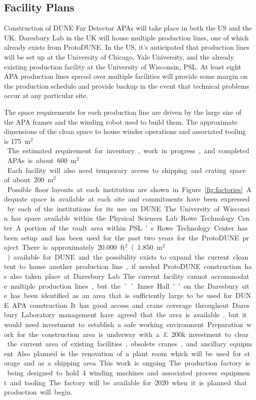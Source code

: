 \subsection{Facility Plans}
\label{sec:fdsp-apa-facility}

Construction of DUNE Far Detector APAs will take place in both the US and the UK. Daresbury Lab in the UK will house multiple production lines, one of which already exists from ProtoDUNE. In the US, it's anticipated that production lines will be set up at the University of Chicago, Yale University, and the already existing production facility at the University of Wisconsin, PSL. At least eight APA production lines spread over multiple facilities will provide some margin on the production schedule and provide backup in the event that technical problems occur at any particular site. 

The space requirements for each production line are driven by the large size of the APA frames and the winding robot used to build them. The approximate dimensions of the clean space to house winder operations and associated tooling is \SI{175}{m$^2$}. The estimated requirement for inventory, work in progress, and completed APAs is about \SI{600}{m$^2$}. Each facility will also need temporary access to shipping and crating space of about \SI{200}{m$^2$}. Possible floor layouts at each institution are shown in Figure~\ref{fig:factories}. Adequate space is available at each site and commitments have been expressed by each of the institutions for its use on DUNE. 

The University of Wisconsin has space available within the Physical Sciences Lab Rowe Technology Center. A portion of the vault area within PSL's Rowe Technology Center has been setup and has been used for the past two years for the ProtoDUNE project. There is approximately \SI{20,000}{ft$^2$} (\SI{1,850}{m$^2$}) available for DUNE and the possibility exists to expand the current clean tent to house another production line, if needed. 

ProtoDUNE construction has also taken place at Daresbury Lab.  The current facility cannot accommodate multiple production lines, but the ``Inner Hall'' on the Daresbury site has been identified as an area that is sufficiently large to be used for DUNE APA construction. It has good access and crane coverage throughout. Daresbury Laboratory management have agreed that the area is available, but it would need investment to establish a safe working environment. Preparation work for the construction area is underway with a \pounds200k investment to clear the current area of existing facilities, obsolete cranes, and ancillary equipment. Also planned is the renovation of a plant room which will be used for storage and as a shipping area. This work is ongoing. The production factory is being designed to hold 4 winding machines and associated process equipment and tooling. The factory will be available for 2020 when it is planned that production will begin. 

